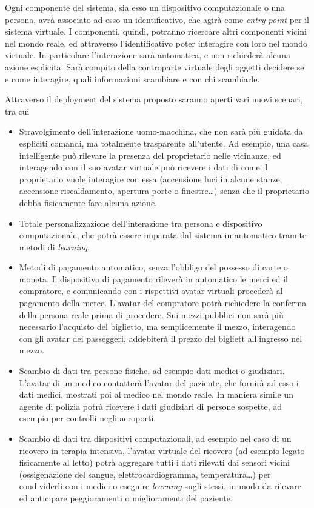 \documentclass[a4paper,12pt]{report}
\begin{document}
Ogni componente del sistema, sia esso un dispositivo computazionale o una persona, avrà associato ad esso un identificativo, che agirà come \emph{entry point} per il sistema virtuale. I componenti, quindi, potranno ricercare altri componenti vicini nel mondo reale, ed attraverso l'identificativo poter interagire con loro nel mondo virtuale. In particolare l'interazione sarà automatica, e non richiederà alcuna azione esplicita. Sarà compito della controparte virtuale degli oggetti decidere se e come interagire, quali informazioni scambiare e con chi scambiarle.

Attraverso il deployment del sistema proposto saranno aperti vari nuovi scenari, tra cui
\begin{itemize}
	\item Stravolgimento dell'interazione uomo-macchina, che non sarà più guidata da espliciti comandi, ma totalmente trasparente all'utente. Ad esempio, una casa intelligente può rilevare la presenza del proprietario nelle vicinanze, ed interagendo con il suo avatar virtuale può ricevere i dati di come il proprietario vuole interagire con essa (accensione luci in alcune stanze, accensione riscaldamento, apertura porte o finestre\dots) senza che il proprietario debba fisicamente fare alcuna azione.
	\item Totale personalizzazione dell'interazione tra persona e dispositivo computazionale, che potrà essere imparata dal sistema in automatico tramite metodi di \emph{learning}.
	\item Metodi di pagamento automatico, senza l'obbligo del possesso di carte o moneta. Il dispositivo di pagamento rileverà in automatico le merci ed il compratore, e comunicando con i rispettivi avatar virtuali procederà al pagamento della merce. L'avatar del compratore potrà richiedere la conferma della persona reale prima di procedere. Sui mezzi pubblici non sarà più necessario l'acquisto del biglietto, ma semplicemente il mezzo, interagendo con gli avatar dei passeggeri, addebiterà il prezzo del bigliett all'ingresso nel mezzo.
	\item Scambio di dati tra persone fisiche, ad esempio dati medici o giudiziari. L'avatar di un medico contatterà l'avatar del paziente, che fornirà ad esso i dati medici, mostrati poi al medico nel mondo reale. In maniera simile un agente di polizia potrà ricevere i dati giudiziari di persone sospette, ad esempio per controlli negli aeroporti. 
	\item Scambio di dati tra dispositivi computazionali, ad esempio nel caso di un ricovero in terapia intensiva, l'avatar virtuale del ricovero (ad esempio legato fisicamente al letto) potrà aggregare tutti i dati rilevati dai sensori vicini (ossigenazione del sangue, elettrocardiogramma, temperatura\dots) per condividerli con i medici o eseguire \emph{learning} sugli stessi, in modo da rilevare ed anticipare peggioramenti o miglioramenti del paziente.
\end{itemize}
\end{document}
